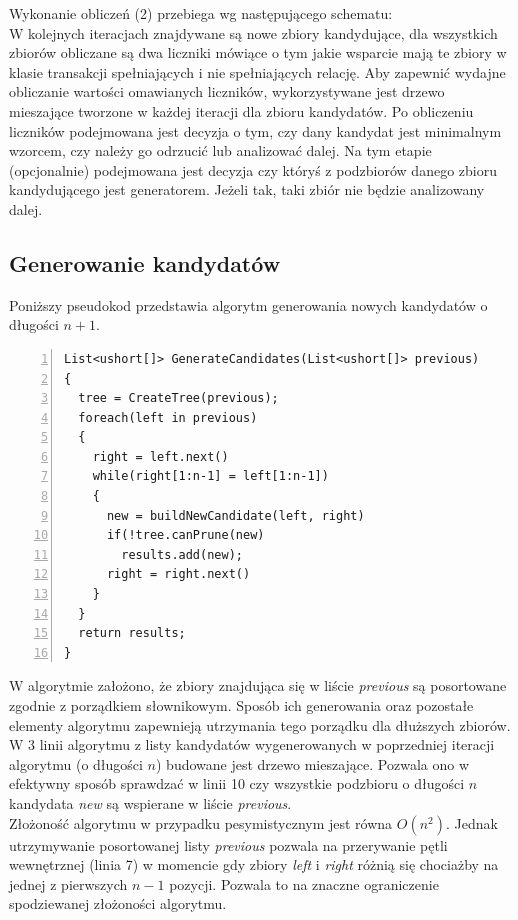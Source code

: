 \documentclass[a4paper,12pt]{article}
\begin{document}
Wykonanie obliczeń (2) przebiega wg następującego schematu:\\

W kolejnych iteracjach znajdywane są nowe zbiory kandydujące, dla wszystkich zbiorów obliczane są dwa liczniki mówiące o tym jakie wsparcie mają te zbiory w klasie transakcji spełniających i nie spełniających relację. Aby zapewnić wydajne obliczanie wartości omawianych liczników, wykorzystywane jest drzewo mieszające tworzone w każdej iteracji dla zbioru kandydatów. Po obliczeniu liczników podejmowana jest decyzja o tym, czy dany kandydat
jest minimalnym wzorcem, czy należy go odrzucić lub analizować dalej. Na tym etapie (opcjonalnie) podejmowana jest decyzja czy któryś z podzbiorów danego zbioru kandydującego jest generatorem. Jeżeli tak, taki zbiór nie będzie analizowany dalej.
\subsection{Generowanie kandydatów}
Poniższy pseudokod przedstawia algorytm generowania nowych kandydatów o długości $n+1$. \\
\begin{center}
\begin{lstlisting}[numbers=left]
List<ushort[]> GenerateCandidates(List<ushort[]> previous)
{
  tree = CreateTree(previous);
  foreach(left in previous)
  {
    right = left.next()
    while(right[1:n-1] = left[1:n-1])
    {
      new = buildNewCandidate(left, right)
      if(!tree.canPrune(new)
        results.add(new);
      right = right.next()
    }
  }
  return results;
}
\end{lstlisting}
\end{center}

W algorytmie założono, że zbiory znajdująca się w liście \textit{previous} są posortowane zgodnie z porządkiem słownikowym. Sposób ich generowania oraz pozostałe elementy algorytmu zapewnieją utrzymania tego porządku dla dłuższych zbiorów.
W 3 linii algorytmu z listy kandydatów wygenerowanych w poprzedniej iteracji algorytmu (o długości $n$) budowane jest drzewo mieszające. Pozwala ono w efektywny sposób sprawdzać w linii 10 czy wszystkie podzbioru o długości $n$ kandydata \textit{new} są wspierane w liście \textit{previous}. \\

Złożoność algorytmu w przypadku pesymistycznym jest równa $O(n^2)$. Jednak utrzymywanie posortowanej listy \textit{previous} pozwala na przerywanie pętli wewnętrznej (linia 7) w momencie gdy zbiory \textit{left} i \textit{right} różnią się chociażby na jednej z pierwszych $n-1$ pozycji. Pozwala to na znaczne ograniczenie spodziewanej złożoności algorytmu.
\end{document}
